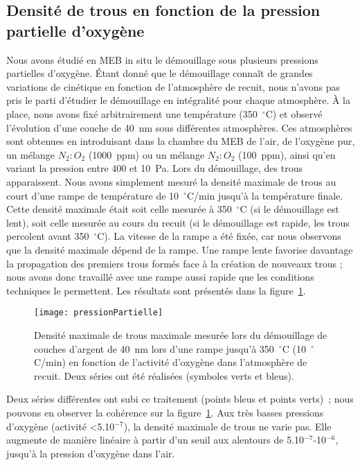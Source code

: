 {{	\subsection{Densité de trous en fonction de la pression partielle d'oxygène}
Nous avons étudié en MEB in situ le démouillage sous plusieurs pressions partielles d’oxygène. Étant donné que le démouillage connaît de grandes variations de cinétique en fonction de l’atmosphère de recuit, nous n’avons pas pris le parti d’étudier le démouillage en intégralité pour chaque atmosphère. À la place, nous avons fixé arbitrairement une température (350~$^\circ$C) et observé l’évolution d’une couche de 40~nm sous différentes atmosphères. Ces atmosphères sont obtenues en introduisant dans la chambre du MEB de l'air, de l'oxygène pur, un mélange $N_2:O_2$ (1000~ppm) ou un mélange $N_2:O_2$ (100~ppm), ainsi qu'en variant la pression entre 400 et 10~Pa. Lors du démouillage, des trous apparaissent. Nous avons simplement mesuré la densité maximale de trous au court d’une rampe de température de 10~$^\circ$C/min jusqu’à la température finale. Cette densité maximale était soit celle mesurée à 350~$^\circ$C (si le démouillage est lent), soit celle mesurée au cours du recuit (si le démouillage est rapide, les trous percolent avant 350~$^\circ$C). La vitesse de la rampe a été fixée, car nous observons que la densité maximale dépend de la rampe. Une rampe lente favorise davantage la propagation des premiers trous formés face à la création de nouveaux trous ; nous avons donc travaillé avec une rampe aussi rapide que les conditions techniques le permettent. Les résultats sont présentés dans la figure~\ref{pressionPartielle}.\par 
\begin{figure}[!htb]
\centering
\texttt{[image: pressionPartielle]}
\caption{Densité  maximale de trous maximale mesurée lors du démouillage de couches d’argent de 40~nm lors d’une rampe jusqu’à 350~$^\circ$C (10~$^\circ$C/min) en fonction de l’activité d’oxygène dans l’atmosphère de recuit. Deux séries ont été réalisées (symboles verts et bleus).}
\label{pressionPartielle}
\end{figure}
Deux séries différentes ont subi ce traitement (points bleus et points verts)~; nous pouvons en observer la cohérence sur la figure~\ref{pressionPartielle}. Aux très basses pressions d’oxygène (activité <5.10$^{-7}$), la densité maximale de trous ne varie pas. Elle augmente de manière linéaire à partir d’un seuil aux alentours de 5.10$^{-7}$-10$^{-6}$, jusqu’à la pression d’oxygène dans l’air.\par 
}}
